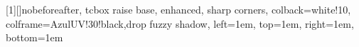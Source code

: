 \newtcbox{\othermathbox}[1][]{nobeforeafter, tcbox raise base, enhanced, sharp corners, colback=white!10, colframe=AzulUV!30!black,drop fuzzy shadow, left=1em, top=1em, right=1em, bottom=1em}

\newcommand*{\colorboxed}{}
\def\colorboxed#1#{%
  \colorboxedAux{#1}%
}
\newcommand*{\colorboxedAux}[3]{%
  \begingroup
    \colorlet{cb@saved}{.}%
    \color#1{#2}%
    \boxed{%
      \color{cb@saved}%
      #3%
    }%
  \endgroup
}
\usepackage{csquotes}
\usepackage[backend=biber, style=numeric, sorting = none]{biblatex} %
